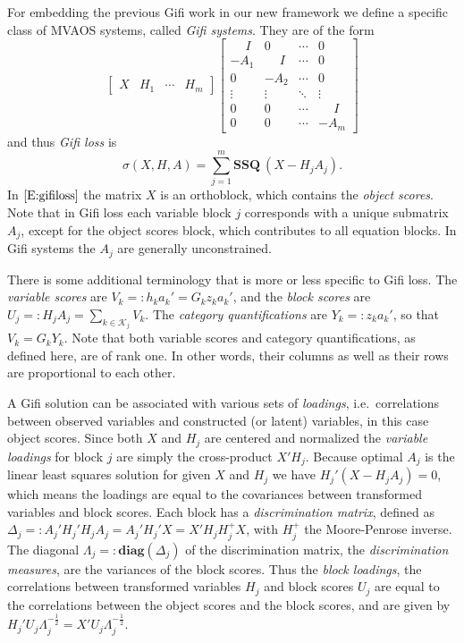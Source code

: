 \documentclass[
  12pt,
]{book}
\begin{document}
For embedding the previous Gifi work in our new framework we define a specific class of MVAOS systems, called \emph{Gifi systems}. They are of the form
\[
\begin{bmatrix}
X&H_1&\cdots&H_m
\end{bmatrix}
\begin{bmatrix}
\phantom{-}I&0&\cdots&0\\
-A_1&\phantom{-}I&\cdots&0\\
0&-A_2&\cdots&0\\
\vdots&\vdots&\ddots&\vdots\\
0&0&\cdots&\phantom{-}I\\
0&0&\cdots&-A_m
\end{bmatrix}
\]
and thus \emph{Gifi loss} is
\begin{equation}
\sigma(X,H,A)=\sum_{j=1}^m\mathbf{SSQ}\ (X-H_jA_j).\label{E:gifiloss}
\end{equation}
In \(\eqref{E:gifiloss}\) the matrix \(X\) is an orthoblock, which contains the \emph{object scores}. Note that in Gifi loss each variable block \(j\) corresponds with a unique submatrix \(A_j\), except for the object scores block, which contributes to all equation blocks. In Gifi systems the \(A_j\) are generally unconstrained.

There is some additional terminology that is more or less specific to Gifi loss. The \emph{variable scores} are \(V_k=:h_ka_k'=G_kz_ka_k'\), and the \emph{block scores} are \(U_j=:H_jA_j=\sum_{k\in\mathcal{K}_j}V_k\). The \emph{category quantifications} are \(Y_k=:z_ka_k'\), so that \(V_k=G_kY_k\). Note that both variable scores and category quantifications, as defined here, are of rank one. In other words, their columns as well as their rows are proportional to each other.

A Gifi solution can be associated with various sets of \emph{loadings}, i.e.~correlations between observed variables and constructed (or latent) variables,
in this case object scores. Since both \(X\) and \(H_j\) are centered and normalized the \emph{variable loadings} for block \(j\) are simply the cross-product \(X'H_j\). Because optimal \(A_j\) is the linear least squares solution for given \(X\) and \(H_j\) we have \(H_j'(X-H_jA_j)=0\), which means the loadings are equal to the covariances between transformed variables and block scores. Each block has a \emph{discrimination matrix}, defined as \(\Delta_j=:A_j'H_j'H_jA_j=A_j'H_j'X=X'H_jH_j^+X\), with \(H_j^+\) the Moore-Penrose inverse. The diagonal \(\Lambda_j=:\mathbf{diag}(\Delta_j)\) of the discrimination matrix, the \emph{discrimination measures}, are the variances of the block scores. Thus the \emph{block loadings}, the correlations between transformed variables \(H_j\) and block scores \(U_j\) are equal to the correlations between the object scores and the block scores, and are given by \(H_j'U_j\Lambda_j^{-\frac12}=X'U_j\Lambda_j^{-\frac12}\).
\end{document}

